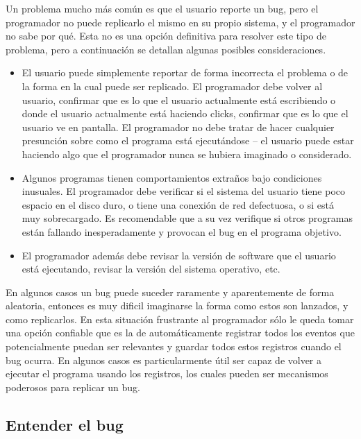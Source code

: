 \documentclass[12pt,a4paper]{report}
\begin{document}
Un problema mucho más común es que el usuario reporte un bug, pero el programador no puede replicarlo el mismo en su propio sistema, y el programador no sabe por qué.  Esta no es una opción definitiva para resolver este tipo de problema, pero a continuación se detallan algunas posibles consideraciones.

\begin{itemize}
	\item El usuario puede simplemente reportar de forma incorrecta el problema o de la forma en la cual puede ser replicado.  El programador debe volver al usuario, confirmar que es lo que el usuario actualmente está escribiendo o donde el usuario actualmente está haciendo clicks, confirmar que es lo que el usuario ve en pantalla.  El programador no debe tratar de hacer cualquier presunción sobre como el programa está ejecutándose -- el usuario puede estar haciendo algo que el programador nunca se hubiera imaginado o considerado.

    \item Algunos programas tienen comportamientos extraños bajo condiciones inusuales.  El programador debe verificar si el sistema del usuario tiene poco espacio en el disco duro, o tiene una conexión de red defectuosa, o si está muy sobrecargado.  Es recomendable que a su vez verifique si otros programas están fallando inesperadamente y provocan el bug en el programa objetivo.

    \item El programador además debe revisar la versión de software que el usuario está ejecutando, revisar la versión del sistema operativo, etc.
\end{itemize}

En algunos casos un bug puede suceder raramente y aparentemente de forma aleatoria, entonces es muy dificil imaginarse la forma como estos son lanzados, y como replicarlos.  En esta situación frustrante al programador sólo le queda tomar una opción confiable que es la de automáticamente registrar todos los eventos que potencialmente puedan ser relevantes y guardar todos estos registros cuando el bug ocurra.  En algunos casos es particularmente útil ser capaz de volver a ejecutar el programa usando los registros, los cuales pueden ser mecanismos poderosos para replicar un bug.


\subsection{Entender el bug}
\end{document}

